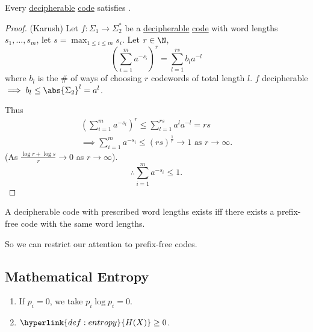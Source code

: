 \documentclass{article}
\newcommand{\1}[1]{\mathbbm{1}_{#1}}
\begin{document}
\begin{nthm}[McMillan]\label{thm:mcmillan}
    Every \hyperlink{def:decipherable}{decipherable} \hyperlink{def:code}{code} satisfies .
\end{nthm}

\begin{proof}(Karush)
    Let $f: \Sigma_1 \to \Sigma_2^*$ be a \hyperlink{def:decipherable}{decipherable} \hyperlink{def:code}{code} with word lengths $s_1, \dotsc, s_m$, let $s = \max_{1 \leq i \leq m} s_i$.
    Let $r \in \N$,
    \begin{equation*}
        \left(\sum_{i=1}^m a^{-s_i}\right)^r = \sum_{l=1}^{rs} b_l a^{-l}
    \end{equation*}
    where $b_l$ is the \# of ways of choosing $r$ codewords of total length $l$. $f$ decipherable $\implies b_l \leq \abs{\Sigma_2}^l = a^l$.

    Thus \begin{gather*}\left(\sum_{i=1}^m a^{-s_i}\right)^r \leq \sum_{l=1}^{rs} a^l a^{-l} = rs \\
    \implies \sum_{i=1}^m a^{-s_i} \leq (rs)^{\frac{1}{r}} \to 1 \text{ as } r \to \infty.
    \end{gather*}
    (As $\frac{\log r + \log s}{r} \to 0$ as $r \to \infty$).
    \begin{equation*}
        \therefore \sum_{i=1}^m a^{-s_i} \leq 1.
    \end{equation*}
\end{proof}

\begin{cor}
    A decipherable code with prescribed word lengths exists iff there exists a prefix-free code with the same word lengths.
\end{cor}
So we can restrict our attention to prefix-free codes.

\subsection{Mathematical Entropy}

\begin{remark}
    \leavevmode
    \begin{enumerate}[label=(\roman*)]
        \item If $p_i = 0$, we take $p_i \log p_i=0$.
        \item $\hyperlink{def:entropy}{H(X)} \geq 0$.
    \end{enumerate}
\end{remark}
\end{document}
